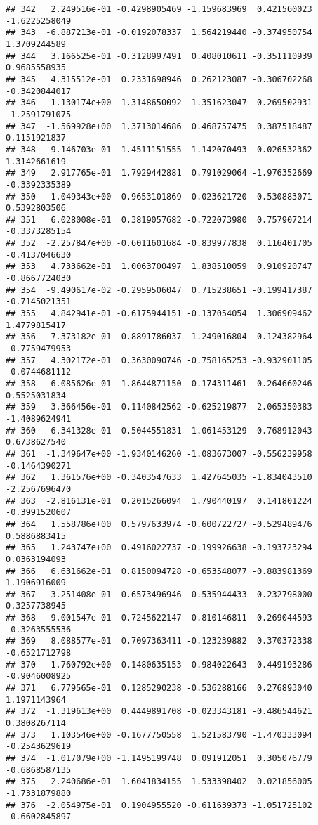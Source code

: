 \documentclass[
]{article}
\begin{document}
\begin{verbatim}
## 342   2.249516e-01 -0.4298905469 -1.159683969  0.421560023 -1.6225258049
## 343  -6.887213e-01 -0.0192078337  1.564219440 -0.374950754  1.3709244589
## 344   3.166525e-01 -0.3128997491  0.408010611 -0.351110939  0.9685558935
## 345   4.315512e-01  0.2331698946  0.262123087 -0.306702268 -0.3420844017
## 346   1.130174e+00 -1.3148650092 -1.351623047  0.269502931 -1.2591791075
## 347  -1.569928e+00  1.3713014686  0.468757475  0.387518487  0.1151921837
## 348   9.146703e-01 -1.4511151555  1.142070493  0.026532362  1.3142661619
## 349   2.917765e-01  1.7929442881  0.791029064 -1.976352669 -0.3392335389
## 350   1.049343e+00 -0.9653101869 -0.023621720  0.530883071  0.5392803506
## 351   6.028008e-01  0.3819057682 -0.722073980  0.757907214 -0.3373285154
## 352  -2.257847e+00 -0.6011601684 -0.839977838  0.116401705 -0.4137046630
## 353   4.733662e-01  1.0063700497  1.838510059  0.910920747 -0.8667724030
## 354  -9.490617e-02 -0.2959506047  0.715238651 -0.199417387 -0.7145021351
## 355   4.842941e-01 -0.6175944151 -0.137054054  1.306909462  1.4779815417
## 356   7.373182e-01  0.8891786037  1.249016804  0.124382964 -0.7759479953
## 357   4.302172e-01  0.3630090746 -0.758165253 -0.932901105 -0.0744681112
## 358  -6.085626e-01  1.8644871150  0.174311461 -0.264660246  0.5525031834
## 359   3.366456e-01  0.1140842562 -0.625219877  2.065350383 -1.4089624941
## 360  -6.341328e-01  0.5044551831  1.061453129  0.768912043  0.6738627540
## 361  -1.349647e+00 -1.9340146260 -1.083673007 -0.556239958 -0.1464390271
## 362   1.361576e+00 -0.3403547633  1.427645035 -1.834043510 -2.2567696470
## 363  -2.816131e-01  0.2015266094  1.790440197  0.141801224 -0.3991520607
## 364   1.558786e+00  0.5797633974 -0.600722727 -0.529489476  0.5886883415
## 365   1.243747e+00  0.4916022737 -0.199926638 -0.193723294  0.0363194093
## 366   6.631662e-01  0.8150094728 -0.653548077 -0.883981369  1.1906916009
## 367   3.251408e-01 -0.6573496946 -0.535944433 -0.232798000  0.3257738945
## 368   9.001547e-01  0.7245622147 -0.810146811 -0.269044593 -0.3263555536
## 369   8.088577e-01  0.7097363411 -0.123239882  0.370372338 -0.6521712798
## 370   1.760792e+00  0.1480635153  0.984022643  0.449193286 -0.9046008925
## 371   6.779565e-01  0.1285290238 -0.536288166  0.276893040  1.1971143964
## 372  -1.319613e+00  0.4449891708 -0.023343181 -0.486544621  0.3808267114
## 373   1.103546e+00 -0.1677750558  1.521583790 -1.470333094 -0.2543629619
## 374  -1.017079e+00 -1.1495199748  0.091912051  0.305076779 -0.6868587135
## 375   2.240686e-01  1.6041834155  1.533398402  0.021856005 -1.7331879880
## 376  -2.054975e-01  0.1904955520 -0.611639373 -1.051725102 -0.6602845897

\end{verbatim}
\end{document}

